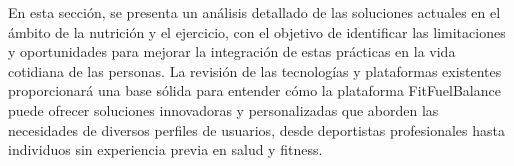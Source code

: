 En esta sección, se presenta un análisis detallado de las soluciones actuales en el ámbito de la nutrición y el ejercicio, con el objetivo de identificar las limitaciones y oportunidades para mejorar la integración de estas prácticas en la vida cotidiana de las personas. La revisión de las tecnologías y plataformas existentes proporcionará una base sólida para entender cómo la plataforma FitFuelBalance puede ofrecer soluciones innovadoras y personalizadas que aborden las necesidades de diversos perfiles de usuarios, desde deportistas profesionales hasta individuos sin experiencia previa en salud y fitness.